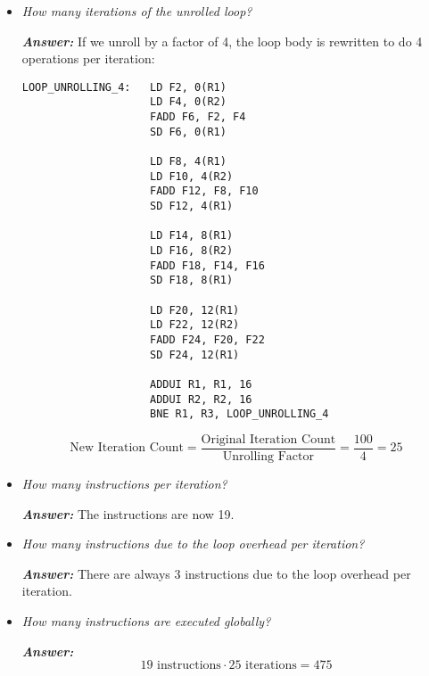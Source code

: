 \begin{itemize}
    \item \emph{How many iterations of the unrolled loop?}

    \textcolor{Green3}{\textbf{\emph{Answer:}}} If we unroll by a factor of 4, the loop body is rewritten to do 4 operations per iteration:

    \begin{lstlisting}
LOOP_UNROLLING_4:   LD F2, 0(R1)
                    LD F4, 0(R2)
                    FADD F6, F2, F4
                    SD F6, 0(R1)

                    LD F8, 4(R1)
                    LD F10, 4(R2)
                    FADD F12, F8, F10
                    SD F12, 4(R1)

                    LD F14, 8(R1)
                    LD F16, 8(R2)
                    FADD F18, F14, F16
                    SD F18, 8(R1)

                    LD F20, 12(R1)
                    LD F22, 12(R2)
                    FADD F24, F20, F22
                    SD F24, 12(R1)

                    ADDUI R1, R1, 16
                    ADDUI R2, R2, 16
                    BNE R1, R3, LOOP_UNROLLING_4\end{lstlisting}
    \begin{equation*}
        \text{New Iteration Count} = \dfrac{\text{Original Iteration Count}}{\text{Unrolling Factor}} = \dfrac{100}{4} = 25
    \end{equation*}


    \item \emph{How many instructions per iteration?}

    \textcolor{Green3}{\textbf{\emph{Answer:}}} The instructions are now 19.


    \item \emph{How many instructions due to the loop overhead per iteration?}

    \textcolor{Green3}{\textbf{\emph{Answer:}}} There are always 3 instructions due to the loop overhead per iteration.


    \item \emph{How many instructions are executed globally?}

    \textcolor{Green3}{\textbf{\emph{Answer:}}}
    \begin{equation*}
        19 \text{ instructions} \cdot 25 \text{ iterations} = 475
    \end{equation*}



\end{itemize}
